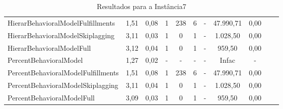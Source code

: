 \begin{table}[h!]
{\begin{tabular}{lcccccccccc}
			HierarBehavioralModelFulfillments  & 1,51   & 0,08 & 1 & 238 & 6 & -          & 47.990,71 & 0,00 \\ 
			HierarBehavioralModelSkiplagging   & 3,11   & 0,03 & 1 & 0   & 1 & -          & 1.028,50  & 0,00 \\ 
			HierarBehavioralModelFull          & 3,12   & 0,04 & 1 & 0   & 1 & -          & 959,50    & 0,00 \\ \hline
			PercentBehavioralModel             & 1,27   & 0,02 & - & -   & - & -          & Infac     & - \\ 
			PercentBehavioralModelFulfillments & 1,51   & 0,08 & 1 & 238 & 6 & -          & 47.990,71 & 0,00 \\ 
			PercentBehavioralModelSkiplagging  & 3,11   & 0,04 & 1 & 0   & 1 & -          & 1.028,50  & 0,00 \\ 
			PercentBehavioralModelFull         & 3,09   & 0,03 & 1 & 0   & 1 & -          & 959,50    & 0,00 \\ \hline
		\end{tabular}%
	}
	\caption{Resultados para a Instância7}
	\label{tab:resul_instan7}
\end{table}


